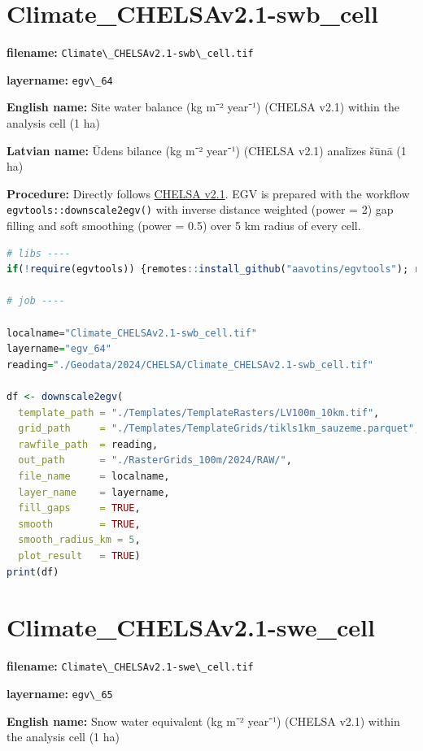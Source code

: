 \documentclass[
]{book}
\newcommand{\passthrough}[1]{#1}
\begin{document}
\section{Climate\_CHELSAv2.1-swb\_cell}\label{ch06.064}

\textbf{filename:} \passthrough{\lstinline!Climate\_CHELSAv2.1-swb\_cell.tif!}

\textbf{layername:} \passthrough{\lstinline!egv\_64!}

\textbf{English name:} Site water balance (kg m⁻² year⁻¹) (CHELSA v2.1) within the analysis cell (1 ha)

\textbf{Latvian name:} Ūdens bilance (kg m⁻² year⁻¹) (CHELSA v2.1) analīzes šūnā (1 ha)

\textbf{Procedure:} Directly follows \hyperref[Ch04.11]{CHELSA v2.1}. EGV is prepared with the
workflow \passthrough{\lstinline!egvtools::downscale2egv()!} with inverse distance weighted (power = 2)
gap filling and soft smoothing (power = 0.5) over 5 km radius of every cell.

\begin{lstlisting}[language=R]
# libs ----
if(!require(egvtools)) {remotes::install_github("aavotins/egvtools"); require(egvtools)}

# job ----

localname="Climate_CHELSAv2.1-swb_cell.tif"
layername="egv_64"
reading="./Geodata/2024/CHELSA/Climate_CHELSAv2.1-swb_cell.tif"

df <- downscale2egv(
  template_path = "./Templates/TemplateRasters/LV100m_10km.tif",
  grid_path     = "./Templates/TemplateGrids/tikls1km_sauzeme.parquet",
  rawfile_path  = reading,
  out_path      = "./RasterGrids_100m/2024/RAW/",
  file_name     = localname,
  layer_name    = layername,
  fill_gaps     = TRUE,
  smooth        = TRUE,
  smooth_radius_km = 5,
  plot_result   = TRUE)
print(df)
\end{lstlisting}

\section{Climate\_CHELSAv2.1-swe\_cell}\label{ch06.065}

\textbf{filename:} \passthrough{\lstinline!Climate\_CHELSAv2.1-swe\_cell.tif!}

\textbf{layername:} \passthrough{\lstinline!egv\_65!}

\textbf{English name:} Snow water equivalent (kg m⁻² year⁻¹) (CHELSA v2.1) within the analysis cell (1 ha)
\end{document}
